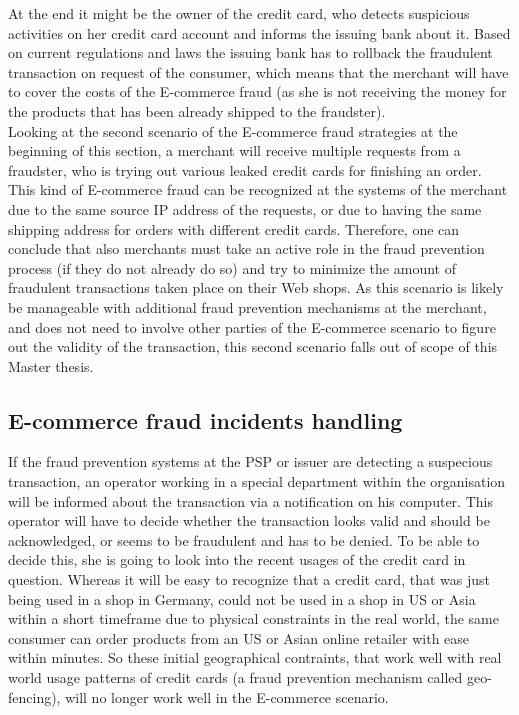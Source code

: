 At the end it might be the owner of the credit card, who detects suspicious activities on her credit card account and informs the issuing bank about it. Based on current regulations and laws the issuing bank has to rollback the fraudulent transaction on request of the consumer, which means that the merchant will have to cover the costs of the E-commerce fraud (as she is not receiving the money for the products that has been already shipped to the fraudster). \\

Looking at the second scenario of the E-commerce fraud strategies at the beginning of this section, a merchant will receive multiple requests from a fraudster, who is trying out various leaked credit cards for finishing an order. This kind of E-commerce fraud can be recognized at the systems of the merchant due to the same source \gls{IP} address of the requests, or due to having the same shipping address for orders with different credit cards. Therefore, one can conclude that also merchants must take an active role in the fraud prevention process (if they do not already do so) and try to minimize the amount of fraudulent transactions taken place on their Web shops. As this scenario is likely be manageable with additional fraud prevention mechanisms at the merchant, and does not need to involve other parties of the E-commerce scenario to figure out the validity of the transaction, this second scenario falls out of scope of this Master thesis.


\subsection{E-commerce fraud incidents handling}
\label{subsec:e_commerce_fraud_handling}

If the fraud prevention systems at the \gls{PSP} or issuer are detecting a suspecious transaction, an operator working in a special department within the organisation will be informed about the transaction via a notification on his computer. This operator will have to decide whether the transaction looks valid and should be acknowledged, or seems to be fraudulent and has to be denied. To be able to decide this, she is going to look into the recent usages of the credit card in question. Whereas it will be easy to recognize that a credit card, that was just being used in a shop in Germany, could not be used in a shop in US or Asia within a short timeframe due to physical constraints in the real world, the same consumer can order products from an US or Asian online retailer with ease within minutes. So these initial geographical contraints, that work well with real world usage patterns of credit cards (a fraud prevention mechanism called geo-fencing), will no longer work well in the E-commerce scenario. \\

